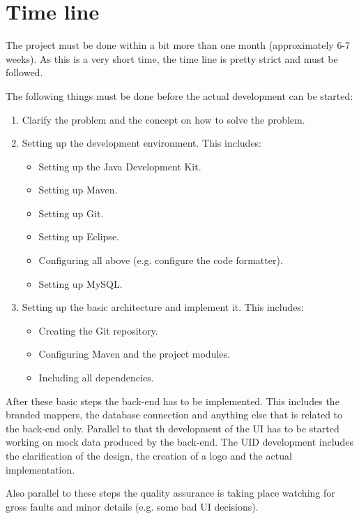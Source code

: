 \documentclass[12pt]{scrreprt}
\begin{document}
	\chapter{Time line}
		\label{ch:time-line}

		The project must be done within a bit more than one month (approximately 6-7 weeks). As this is a very short time, the time line is pretty strict and must be followed.

		The following things must be done before the actual development can be started:
		\begin{enumerate}
			\item Clarify the problem and the concept on how to solve the problem.
			\item Setting up the development environment. This includes:
				\begin{itemize}
					\item Setting up the Java Development Kit.
					\item Setting up Maven.
					\item Setting up Git.
					\item Setting up Eclipse.
					\item Configuring all above (e.g. configure the code formatter).
					\item Setting up MySQL.
				\end{itemize}
			\item Setting up the basic architecture and implement it. This includes:
				\begin{itemize}
					\item Creating the Git repository.
					\item Configuring Maven and the project modules.
					\item Including all dependencies.
				\end{itemize}
		\end{enumerate}

		After these basic steps the back-end has to be implemented. This includes the branded mappers, the database connection and anything else that is related to the back-end only. Parallel to that th development of the UI has to be started working on mock data produced by the back-end. The UID development includes the clarification of the design, the creation of a logo and the actual implementation.

		Also parallel to these steps the quality assurance is taking place watching for gross faults and minor details (e.g. some bad UI decisions).
\end{document}

